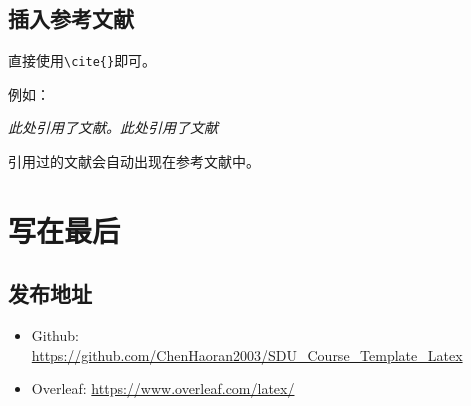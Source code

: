 \documentclass[12pt,hyperref,a4paper,UTF8]{ctexart}
\begin{document}
%
%
%
%
%
%

\subsection{插入参考文献}
直接使用\verb|\cite{}|即可。

例如：


   \textit{ 此处引用了文献\cite{OFDMAbackscatter}。此处引用了文献\cite{DigiScatter}}


引用过的文献会自动出现在参考文献中。

\section{写在最后}
\subsection{发布地址}
\begin{itemize}
    \item Github: \url{https://github.com/ChenHaoran2003/SDU_Course_Template_Latex}
    \item Overleaf:  \url{https://www.overleaf.com/latex/}
\end{itemize}


\end{document}
